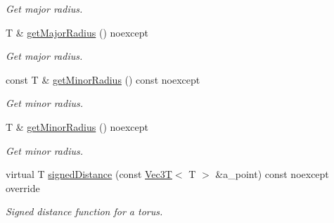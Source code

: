 \begin{DoxyCompactItemize}
\begin{DoxyCompactList}\small\item\em Get major radius. \end{DoxyCompactList}\item 
T \& \hyperlink{classTorusSDF_a81910ce83df61223ab3484c7de0747c7}{get\+Major\+Radius} () noexcept
\begin{DoxyCompactList}\small\item\em Get major radius. \end{DoxyCompactList}\item 
const T \& \hyperlink{classTorusSDF_a3af383d80c8d11ab9d39fc872d661a42}{get\+Minor\+Radius} () const noexcept
\begin{DoxyCompactList}\small\item\em Get minor radius. \end{DoxyCompactList}\item 
T \& \hyperlink{classTorusSDF_a0eff8ed5c429c6f80580c9660ac9cdfa}{get\+Minor\+Radius} () noexcept
\begin{DoxyCompactList}\small\item\em Get minor radius. \end{DoxyCompactList}\item 
virtual T \hyperlink{classTorusSDF_a23b4d455de2b7b9988ce81833ccd5302}{signed\+Distance} (const \hyperlink{classVec3T}{Vec3T}$<$ T $>$ \&a\+\_\+point) const noexcept override
\begin{DoxyCompactList}\small\item\em Signed distance function for a torus. \end{DoxyCompactList}\end{DoxyCompactItemize}
